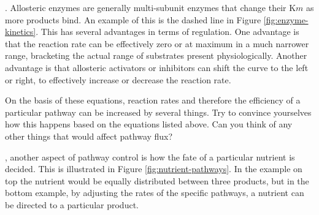 \documentclass{tufte-handout}
\begin{document}
.  Allosteric enzymes are generally multi-subunit enzymes that change their K${m}$ as more products bind.  An example of this is the dashed line in Figure \ref{fig:enzyme-kinetics}.  This has several advantages in terms of regulation.  One advantage is that the reaction rate can be effectively zero or at maximum in a much narrower range, bracketing the actual range of substrates present physiologically.  Another advantage is that allosteric activators or inhibitors can shift the curve to the left or right, to effectively increase or decrease the reaction rate. 

On the basis of these equations, reaction rates and therefore the efficiency of a particular pathway can be increased by several things.  Try to convince yourselves how this happens based on the equations listed above. Can you think of any other things that would affect pathway flux? 

, another aspect of pathway control is how the fate of a particular nutrient is decided.  This is illustrated in Figure \ref{fig:nutrient-pathways}.  In the example on top the nutrient would be equally distributed between three products, but in the bottom example, by adjusting the rates of the specific pathways, a nutrient can be directed to a particular product.  
\end{document}
